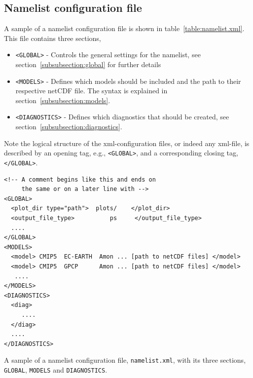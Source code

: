 \documentclass[12pt]{article}
\begin{document}
% 
% 
\subsection{Namelist configuration file}\label{subsection:namelist_conf_file}
A sample of a namelist configuration file is shown in
table~\vref{table:namelist.xml}. This file contains three sections, 

\begin{itemize}
\item{\texttt{<GLOBAL>}} - Controls the general settings for the namelist,
see section~\ref{subsubsection:global} for further details
\item{\texttt{<MODELS>}} - Defines which models should be included and
the path to their respective netCDF file. The syntax is explained in
section~\ref{subsubsection:models}. 
\item{\texttt{<DIAGNOSTICS>}} - Defines which diagnostics that should
be created, see section~\ref{subsubsection:diagnostics}. 
\end{itemize}
Note the logical structure of the xml-configuration files, or indeed
any xml-file, is described by an opening tag, e.g., \texttt{<GLOBAL>},
and a corresponding closing tag, \texttt{</GLOBAL>}. 
%
%
\begin{table}
\begin{Verbatim}[frame=single, fontsize=\footnotesize]
<!-- A comment begins like this and ends on
     the same or on a later line with -->
<GLOBAL>
  <plot_dir type="path">  plots/    </plot_dir>
  <output_file_type>          ps     </output_file_type>
  ....
</GLOBAL>
<MODELS>
  <model> CMIP5  EC-EARTH  Amon ... [path to netCDF files] </model>
  <model> CMIP5  GPCP      Amon ... [path to netCDF files] </model>
   ....
</MODELS>
<DIAGNOSTICS>
  <diag>
     ....
  </diag>
  ....
</DIAGNOSTICS>
\end{Verbatim}
\caption{A sample of a namelist configuration file,
  \texttt{namelist.xml}, with its three sections,
  \texttt{GLOBAL}, \texttt{MODELS} and \texttt{DIAGNOSTICS}.}\label{table:namelist.xml}
\end{table}


\end{document}
